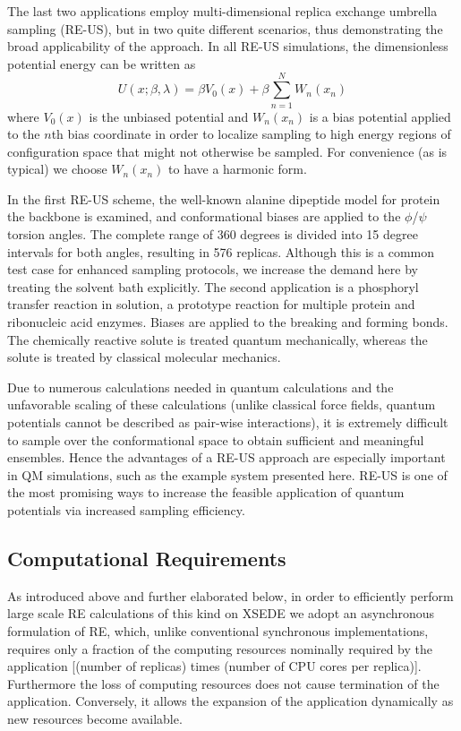 \documentclass{sig-alternate}
\begin{document}
The last two applications employ multi-dimensional replica exchange umbrella 
sampling (RE-US), but in two quite different scenarios, thus demonstrating the 
broad applicability of the approach.  In all RE-US simulations, the 
dimensionless potential energy can be written as
\begin{equation}
U(x;\beta,\lambda) = \beta V_0(x) + \beta \sum_{n=1}^N W_n(x_n)
\end{equation}
where $V_0(x)$ is the unbiased potential and $W_n(x_n)$ is a bias potential 
applied to the $n$th bias coordinate in order to localize sampling to high 
energy regions of configuration space that might not otherwise be sampled. For 
convenience (as is typical) we choose $W_n(x_n)$ to have a harmonic form. 

In the first RE-US scheme, the well-known alanine dipeptide model for protein 
the backbone is examined, and conformational biases are applied to the 
$\phi$/$\psi$ torsion angles. The complete range of 360 degrees is divided into
15 degree intervals for both angles, resulting in 576 replicas. Although this 
is a common test case for enhanced sampling protocols, we increase the demand 
here by treating the solvent bath explicitly. The second application is a 
phosphoryl transfer reaction in solution, a prototype reaction for multiple 
protein and ribonucleic acid enzymes. Biases are applied to the breaking and
forming bonds. The chemically reactive solute is treated quantum mechanically, 
whereas the solute is treated by classical molecular mechanics. 

Due to numerous calculations needed in quantum calculations and the unfavorable
scaling of these calculations (unlike classical force fields, quantum 
potentials cannot be described as pair-wise interactions), it is extremely 
difficult to sample over the conformational space to obtain sufficient and 
meaningful ensembles.  Hence the advantages of a RE-US approach are especially 
important in QM simulations, such as the example system presented here.  RE-US
is one of the most promising ways to increase the feasible application of 
quantum potentials via increased sampling efficiency.

\subsection{Computational Requirements}

As introduced above and further elaborated below, in order to
efficiently perform large scale RE calculations of this kind on XSEDE
we adopt an asynchronous formulation of RE, which, unlike conventional
synchronous implementations, requires only a fraction of the computing
resources nominally required by the application [(number of replicas)
  times (number of CPU cores per replica)]. Furthermore the loss of
computing resources does not cause termination of the
application. Conversely, it allows the expansion of the application
dynamically as new resources become available.
\end{document}
